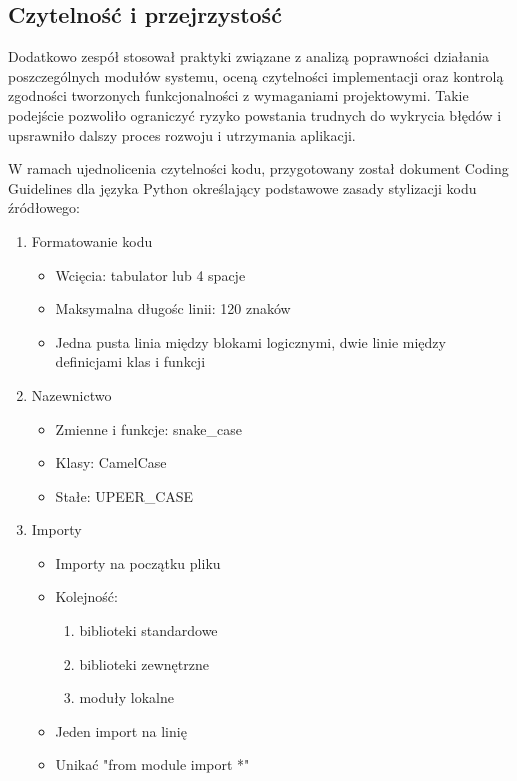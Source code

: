 \subsection{Czytelność i przejrzystość}
\par
Dodatkowo zespół stosował praktyki związane z analizą poprawności działania poszczególnych modułów systemu, oceną czytelności implementacji oraz kontrolą zgodności tworzonych funkcjonalności z wymaganiami projektowymi.
Takie podejście pozwoliło ograniczyć ryzyko powstania trudnych do wykrycia błędów i upsrawniło dalszy proces rozwoju i utrzymania aplikacji.
\par
W ramach ujednolicenia czytelności kodu, przygotowany został dokument \gls{Coding Guidelines} dla języka Python określający podstawowe zasady stylizacji kodu źródłowego:
\begin{enumerate}
    \item Formatowanie kodu 
    \begin{itemize}
        \item Wcięcia: tabulator lub 4 spacje
        \item Maksymalna długośc linii: 120 znaków
        \item Jedna pusta linia między blokami logicznymi, dwie linie między definicjami klas i funkcji
    \end{itemize}
    \item Nazewnictwo 
    \begin{itemize}
        \item Zmienne i funkcje: snake\_case
        \item Klasy: CamelCase
        \item Stałe: UPEER\_CASE
    \end{itemize}
    \item Importy
    \begin{itemize}
        \item Importy na początku pliku
        \item Kolejność: 
        \begin{enumerate}
            \item biblioteki standardowe
            \item biblioteki zewnętrzne
            \item moduły lokalne
        \end{enumerate}
        \item Jeden import na linię
        \item Unikać "from module import *"
    \end{itemize}

\end{enumerate}
